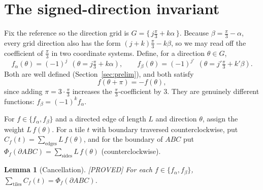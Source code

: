 \documentclass[11pt,reqno]{amsart}
\theoremstyle{plain}
\newtheorem{lemma}[theorem]{Lemma}
\theoremstyle{definition}
\newcommand{\lab}[1]{\hfill\textnormal{\footnotesize\textsc{[#1]}}}
\begin{document}
\section{The signed-direction invariant}\label{sec:invariant}

Fix the reference so the direction grid is $G=\{\,j\frac\pi3+k\alpha\,\}$. Because
$\beta=\frac\pi3-\alpha$, every grid direction also has the form $(j+k)\frac\pi3-k\beta$, so we may
read off the coefficient of $\frac\pi3$ in two coordinate systems. Define, for a direction
$\theta\in G$,
\[
f_\alpha(\theta)=(-1)^{j}\ \ (\theta=j\tfrac\pi3+k\alpha),\qquad
f_\beta(\theta)=(-1)^{j'}\ \ (\theta=j'\tfrac\pi3+k'\beta).
\]
Both are well defined (Section~\ref{sec:prelim}), and both satisfy
\begin{equation}\label{eq:antisym}
f(\theta+\pi)=-f(\theta),
\end{equation}
since adding $\pi=3\cdot\frac\pi3$ increases the $\frac\pi3$-coefficient by $3$. They are genuinely
different functions: $f_\beta=(-1)^{k}f_\alpha$.

For $f\in\{f_\alpha,f_\beta\}$ and a directed edge of length $L$ and direction $\theta$, assign the
weight $L\,f(\theta)$. For a tile $t$ with boundary traversed counterclockwise, put
$C_f(t)=\sum_{\text{edges}}L\,f(\theta)$, and for the boundary of $ABC$ put
$\Phi_f(\partial ABC)=\sum_{\text{sides}}L\,f(\theta)$ (counterclockwise).

\begin{lemma}[Cancellation]\label{lem:cancel}\lab{PROVED}
For each $f\in\{f_\alpha,f_\beta\}$, $\displaystyle\sum_{\text{tiles}}C_f(t)=\Phi_f(\partial ABC)$.
\end{lemma}
\end{document}
